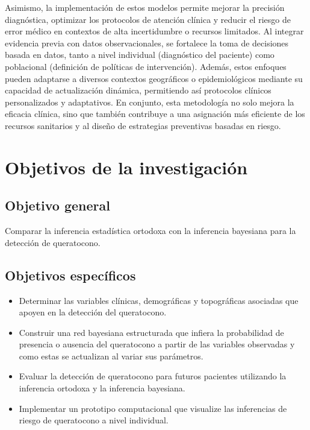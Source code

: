 Asimismo, la implementación de estos modelos permite mejorar la precisión diagnóstica, optimizar los protocolos de atención clínica y reducir el riesgo de error médico en contextos de alta incertidumbre o recursos limitados. Al integrar evidencia previa con datos observacionales, se fortalece la toma de decisiones basada en datos, tanto a nivel individual (diagnóstico del paciente) como poblacional (definición de políticas de intervención). Además, estos enfoques pueden adaptarse a diversos contextos geográficos o epidemiológicos mediante su capacidad de actualización dinámica, permitiendo así protocolos clínicos personalizados y adaptativos. En conjunto, esta metodología no solo mejora la eficacia clínica, sino que también contribuye a una asignación más eficiente de los recursos sanitarios y al diseño de estrategias preventivas basadas en riesgo.

\section{Objetivos de la investigación}
\subsection{Objetivo general}
Comparar la inferencia estadística ortodoxa con la inferencia bayesiana para la detección de queratocono.
\subsection{Objetivos específicos}
\begin{itemize}
	\item Determinar las variables clínicas, demográficas y topográficas asociadas que apoyen en la detección del queratocono.
	\item Construir una red bayesiana estructurada que infiera la probabilidad de presencia o ausencia del queratocono a partir de las variables observadas y como estas se actualizan al variar sus parámetros.
	\item Evaluar la detección de queratocono para futuros pacientes utilizando la inferencia ortodoxa y la inferencia bayesiana.
	\item Implementar un prototipo computacional que visualize las inferencias de riesgo de queratocono a nivel individual.
\end{itemize}
